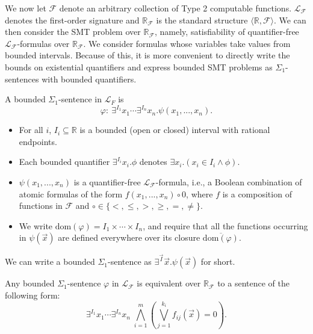 \documentclass[envcountsect]{llncs}
\newcommand{\dom}{\mathrm{dom}}
\begin{document}
We now let $\mathcal{F}$ denote an arbitrary collection of Type 2 computable functions. $\mathcal{L}_{\mathcal{F}}$ denotes the first-order signature and $\mathbb{R}_{\mathcal{F}}$ is the standard structure $\langle \mathbb{R}, \mathcal{F}\rangle$. We can then consider the SMT problem over $\mathbb{R}_{\mathcal{F}}$, namely, satisfiability of quantifier-free $\mathcal{L}_{\mathcal{F}}$-formulas over $\mathbb{R}_{\mathcal{F}}$. We consider formulas whose variables take values from bounded intervals. Because of this, it is more convenient to directly write the bounds on existential quantifiers and express bounded SMT problems as $\Sigma_1$-sentences with bounded quantifiers.
\begin{definition}
A bounded $\Sigma_1$-sentence in $\mathcal{L}_{F}$ is
$$\varphi:\ \exists^{I_1}x_1\cdots \exists^{I_n}x_n. \psi(x_1,...,x_n).$$
\begin{itemize}
\item For all $i$, $I_i\subseteq \mathbb{R}$ is a bounded (open or closed) interval with rational endpoints. 
\item Each bounded quantifier $\exists^{I_i}x_i.\phi$ denotes $\exists x_i.(x_i\in I_i\wedge \phi)$. 
\item $\psi(x_1,...,x_n)$ is a quantifier-free $\mathcal{L}_{\mathcal{F}}$-formula, i.e., a Boolean combination of atomic formulas of the form $f(x_1,...,x_n)\circ 0$, where $f$ is a composition of functions in $\mathcal{F}$ and $\circ\in\{<,\leq, >, \geq, =, \neq \}$. 
\item We write $\dom(\varphi)= I_1\times \cdots \times I_n$, and require that all the functions occurring in $\psi(\vec x)$ are defined everywhere over its closure $\overline{\dom(\varphi)}$.
\end{itemize}
We can write a bounded $\Sigma_1$-sentence as $\exists^{\vec I}\vec x.\psi(\vec x)$ for short.
\end{definition}
\begin{lemma}\label{pre1}
Any bounded $\Sigma_1$-sentence $\varphi$ in $\mathcal{L}_{\mathcal{F}}$ is equivalent over $\mathbb{R}_{\mathcal{F}}$ to a sentence of the following form:
$$\exists^{I_1}x_1\cdots \exists^{I_n}x_n\;\bigwedge_{i=1}^m(\bigvee_{j=1}^{k_i} f_{ij}(\vec x)=0).$$ 
\end{lemma}
\end{document}
